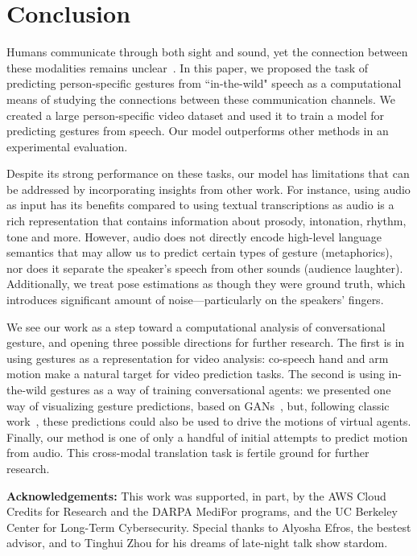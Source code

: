 \documentclass[10pt,twocolumn,letterpaper]{article}
\begin{document}
\section{Conclusion}

Humans communicate through both sight and sound, yet the connection between these modalities remains unclear~\cite{kendon_2004}. In this paper, we proposed the task of predicting person-specific gestures from ``in-the-wild" speech as a computational means of studying the connections between these communication channels. We created a large person-specific video dataset and used it to train a model for predicting gestures from speech. Our model outperforms other methods in an experimental evaluation.

Despite its strong performance on these tasks, our model has limitations that can be addressed by incorporating insights from other work. For instance, using audio as input has its benefits compared to using textual transcriptions as audio is a rich representation that contains information about prosody, intonation, rhythm, tone and more. However, audio does not directly encode high-level language semantics that may allow us to predict certain types of gesture (\eg metaphorics), nor does it separate the speaker's speech from other sounds (\eg audience laughter). Additionally, we treat pose estimations as though they were ground truth, which introduces significant amount of noise---particularly on the speakers' fingers.

We see our work as a step toward a computational analysis of conversational gesture, and opening three possible directions for further research. The first is in using gestures as a representation for video analysis: co-speech hand and arm motion make a natural target for video prediction tasks. The second is using in-the-wild gestures as a way of training conversational agents: we presented one way of visualizing gesture predictions, based on GANs~\cite{Chan2018dance}, but, following classic work~\cite{cassell2000embodied}, these predictions could also be used to drive the motions of virtual agents. Finally, our method is one of only a handful of initial attempts to predict motion from audio. This cross-modal translation task is fertile ground for further research. 

\vspace{3mm}
\noindent
{\small{\bf Acknowledgements:} This work was supported, in part, by the AWS Cloud Credits for Research and the DARPA MediFor programs, and the UC Berkeley Center for Long-Term Cybersecurity. Special thanks to Alyosha Efros, the bestest advisor, and to Tinghui Zhou for his dreams of late-night talk show stardom.}
\end{document}
